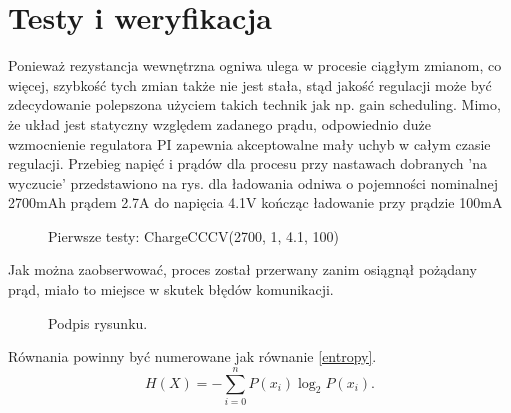 \documentclass[polish,engineer]{polsl-msth}
\begin{document}
\chapter{Testy i weryfikacja}


Ponieważ rezystancja wewnętrzna ogniwa ulega w procesie ciągłym zmianom, co więcej, szybkość tych zmian także nie jest stała, stąd jakość regulacji może być zdecydowanie polepszona użyciem takich technik jak np. gain scheduling.
Mimo, że układ jest statyczny względem zadanego prądu, odpowiednio duże wzmocnienie regulatora PI zapewnia akceptowalne mały uchyb w całym czasie regulacji. 
Przebieg napięć i prądów dla procesu przy nastawach dobranych 'na wyczucie' przedstawiono na rys. dla ładowania odniwa o pojemności nominalnej 2700mAh prądem 2.7A do napięcia 4.1V kończąc ładowanie przy prądzie 100mA
\begin{figure}[hbtp]
     \caption{Pierwsze testy: ChargeCCCV(2700, 1, 4.1, 100) \label{img:1strun}}
\end{figure}
Jak można zaobserwować, proces został przerwany zanim osiągnął pożądany prąd, miało to miejsce w skutek błędów komunikacji.



\newpage
\begin{figure}[hbtp]
     \caption{Podpis rysunku. \label{img:!_some_label}}
\end{figure}

Równania powinny być numerowane jak równanie \ref{entropy}.
\begin{equation}
H(X) = -\sum_{i=0}^n P(x_i) \log_2 P(x_i).\label{entropy}
\end{equation}

 

\end{document}
